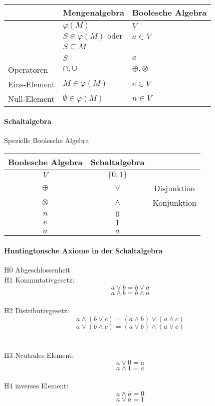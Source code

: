 \documentclass[a4paper]{scrartcl}
\begin{document}
				 \begin{table}[H]
				 	\centering
				 	\begin{tabular}{|l|l|l|}
				 		\hline
				 		&Mengenalgebra & Boolesche Algebra\\ \hline
				 		&\( \varphi (M) \) & \( V \) \\
				 		&\( S \in \varphi (M) \text{ oder} \) & \( a \in V \) \\
				 		&\(  S \subseteq M  \)& \\ \hline
				 		&\( \overline{S} \) & \( \overline{a} \) \\
				 		Operatoren &\( \cap , \cup  \) & \( \oplus , \otimes \)  \\
				 		Eins-Element &\( M \in \varphi (M) \) & \( e \in V \)  \\
				 		Null-Element &\( \emptyset \in \varphi(M) \) & \( n \in V \) \\ \hline
				 	\end{tabular}
				 \end{table}				 
				 
				 \paragraph{Schaltalgebra }
				 Spezielle Boolesche Algebra
				 \begin{table}[H]
				 	\centering
				 	\begin{tabular}{|c|c|c|}
				 		\hline
				 		Boolesche Algebra & Schaltalgebra&\\ \hline
				 		\( V \) & \( \{ 0, 1 \}  \) &\\
				 		\( \oplus \) & \( \vee \)  & Disjunktion \\
				 		\( \otimes \) & \( \wedge \)  & Konjunktion\\
				 		\( n \) & \( 0 \)& \\
				 		\( e \) & \( 1 \) &\\ 
				 		\( \overline{a} \) & \( \overline{a} \) &\\ \hline
				 	\end{tabular}
				 \end{table}
				 
				 \paragraph{Huntingtonsche Axiome in der Schaltalgebra}
				 
				 H0 Abgeschlossenheit \\
				 H1 Kommutativgesetz:
				 \[ a \vee b = b \vee a \]
				 \[ a \wedge b = b \wedge a \]
				 \\
				 H2 Distributivgesetz: 
				 \[ a \wedge ( b \vee c) = ( a \wedge b) \vee ( a \wedge c ) \]
				 \[ a \vee ( b \wedge c) = ( a \vee b) \wedge ( a \vee c ) \]\\
				 \\
				 H3 Neutrales Element:
				 \[ a \vee 0 = a \]
				 \[ a \wedge 1 = a \]
				 \\
				 H4 inverses Element:
				 \[ a \wedge \overline{a} = 0 \]
				 \[ a \vee \overline{a} = 1 \]
				 
\end{document}
